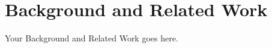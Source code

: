 \section{Background and Related Work}\label{sec:background-and-related-work}

Your Background and Related Work goes here.